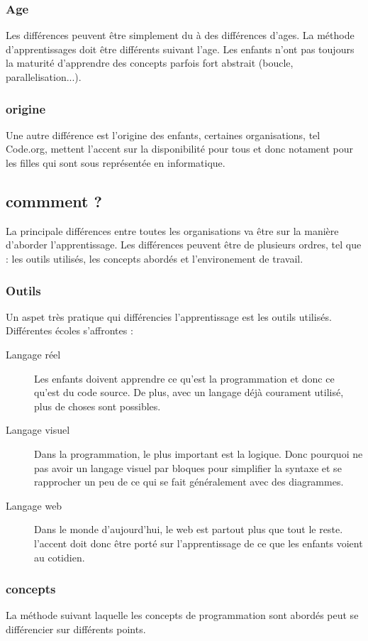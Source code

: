 \subsubsection{Age}
Les différences peuvent être simplement du à des différences d'ages. La méthode d'apprentissages doit être différents suivant l'age. Les enfants n'ont pas toujours la maturité d'apprendre des concepts parfois fort abstrait (boucle, parallelisation...).

\subsubsection{origine}
Une autre différence est l'origine des enfants, certaines organisations, tel Code.org, mettent l'accent sur la disponibilité pour tous et donc notament pour les filles qui sont sous représentée en informatique.

\subsection{commment ?}
La principale différences entre toutes les organisations va être sur la manière d'aborder l'apprentissage. Les différences peuvent être de plusieurs ordres, tel que : les outils utilisés, les concepts abordés et l'environement de travail.

\subsubsection{Outils} Un aspet très pratique qui différencies l'apprentissage est les outils utilisés. Différentes écoles s'affrontes :
\begin{description}
  \item[Langage réel] Les enfants doivent apprendre ce qu'est la programmation et donc ce qu'est du code source. De plus, avec un langage déjà courament utilisé, plus de choses sont possibles.
  \item[Langage visuel] Dans la programmation, le plus important est la logique. Donc pourquoi ne pas avoir un langage visuel par bloques pour simplifier la syntaxe et se rapprocher un peu de ce qui se fait généralement avec des diagrammes.
  \item[Langage web] Dans le monde d'aujourd'hui, le web est partout plus que tout le reste. l'accent doit donc être porté sur l'apprentissage de ce que les enfants voient au cotidien.
\end{description}

\subsubsection{concepts} 
La méthode suivant laquelle les concepts de programmation sont abordés peut se différencier sur différents points.

